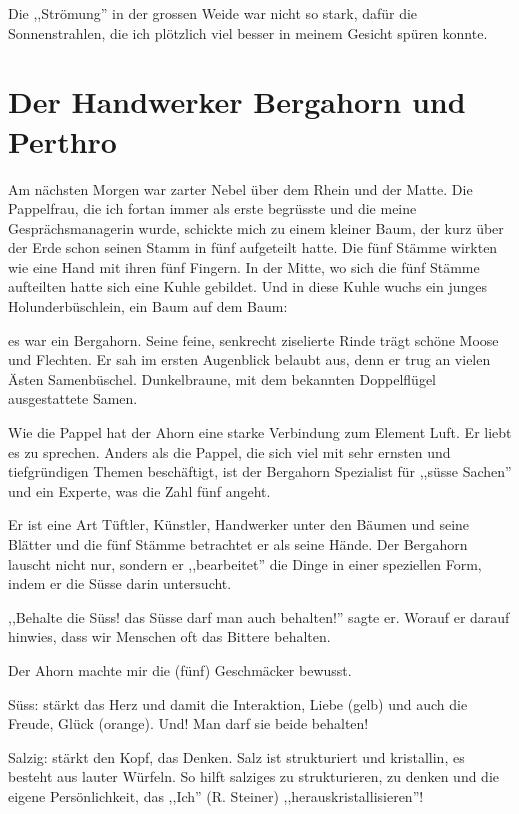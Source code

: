 \documentclass[11pt,titlepage,a5paper]{book}
\begin{document}
Die ,,Strömung'' in der grossen Weide war nicht so stark, dafür die Sonnenstrahlen, die ich plötzlich viel besser in meinem Gesicht spüren konnte.

\section{Der Handwerker Bergahorn und Perthro  }

Am nächsten Morgen war zarter Nebel über dem Rhein und der Matte. Die Pappelfrau, die ich fortan immer als erste begrüsste und die meine Gesprächsmanagerin wurde, schickte mich zu einem kleiner Baum, der kurz über der Erde schon seinen Stamm in fünf aufgeteilt hatte. Die fünf Stämme wirkten wie eine Hand mit ihren fünf Fingern. In der Mitte, wo sich die fünf Stämme aufteilten hatte sich eine Kuhle gebildet. Und in diese Kuhle wuchs ein junges Holunderbüschlein, ein Baum auf dem Baum:

es war ein Bergahorn. Seine feine, senkrecht ziselierte Rinde trägt schöne Moose und Flechten. Er sah im ersten Augenblick belaubt aus, denn er trug an vielen Ästen Samenbüschel. Dunkelbraune, mit dem bekannten Doppelflügel ausgestattete Samen.

Wie die Pappel hat der Ahorn eine starke Verbindung zum Element Luft. Er liebt es zu sprechen. Anders als die Pappel, die sich viel mit sehr ernsten und tiefgründigen Themen beschäftigt, ist der Bergahorn Spezialist für ,,süsse Sachen'' und ein Experte, was die Zahl fünf angeht.

Er ist eine Art Tüftler, Künstler, Handwerker unter den Bäumen und seine Blätter und die fünf Stämme betrachtet er als seine Hände. Der Bergahorn lauscht nicht nur, sondern er ,,bearbeitet'' die Dinge in einer speziellen Form, indem er die Süsse darin untersucht.

,,Behalte die Süss! das Süsse darf man auch behalten!'' sagte er. Worauf er darauf hinwies, dass wir Menschen oft das Bittere behalten. 

Der Ahorn machte mir die (fünf) Geschmäcker bewusst.

Süss: stärkt das Herz und damit die Interaktion, Liebe (gelb) und auch die Freude, Glück (orange). Und! Man darf sie beide behalten!

Salzig: stärkt den Kopf, das Denken. Salz ist strukturiert und kristallin, es besteht aus lauter Würfeln. So hilft salziges zu strukturieren, zu denken und die eigene Persönlichkeit, das ,,Ich'' (R. Steiner) ,,herauskristallisieren''!
\end{document}
